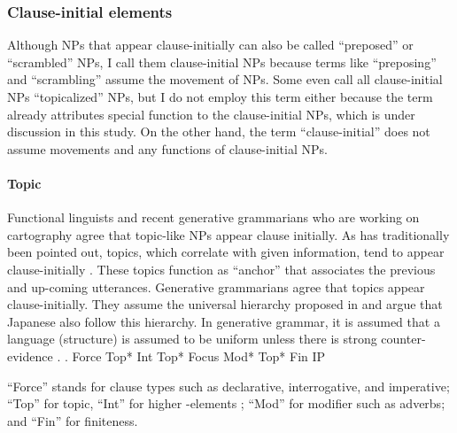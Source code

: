 
\subsubsection{Clause-initial elements}

Although NPs that appear clause-initially can also be called
``preposed'' or ``scrambled'' NPs,
I call them clause-initial NPs
because terms like ``preposing'' and ``scrambling'' assume
the movement of NPs.
Some even call all clause-initial NPs ``topicalized'' NPs,
but I do not employ this term either because
the term already attributes special function to the clause-initial NPs,
which is under discussion in this study.
On the other hand, the term ``clause-initial'' does not assume movements
and any functions of clause-initial NPs.

\paragraph{Topic}

Functional linguists and recent generative grammarians who are working on cartography agree that topic-like NPs appear clause initially.
As has traditionally been pointed out,
topics, which correlate with given information,
tend to appear clause-initially
\cite{mathesius28,firbas64,danes70,kuno78}.
These topics function as ``anchor''
that associates the previous and up-coming utterances.
Generative grammarians \cite[e.g.,][]{endo14} agree that
topics appear clause-initially.
They assume the universal hierarchy \Next proposed in 
and argue that Japanese also follow this hierarchy.
In generative grammar,
it is assumed that a language (structure) is assumed to be uniform
unless there is strong counter-evidence
\cite[the Uniformity Principle:][p.~2]{chomsky01}.
%
 \ex. Force Top* Int Top* Focus Mod* Top* Fin IP
    \hfill{\cite[p.~242]{rizzi04}}

``Force'' stands for clause types such as declarative, interrogative, and imperative;
``Top'' for topic,
``Int'' for higher -elements \cite{rizzi01};
``Mod'' for modifier such as adverbs; and
``Fin'' for finiteness.


